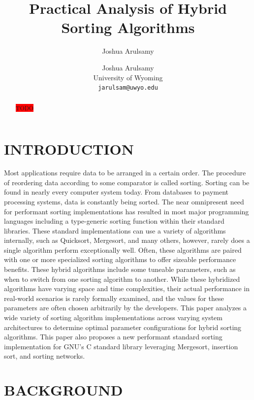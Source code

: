 \documentclass[12pt, conference]{ieeeconf}
\title{\LARGE \bf Practical Analysis of Hybrid Sorting Algorithms}
\author{Joshua Arulsamy}
\author{\parbox{3 in}{
\centering
Joshua Arulsamy\\
University of Wyoming\\
{\tt\small jarulsam@uwyo.edu}}}
\newcommand{\todo}{\colorbox{red}{TODO}}
\begin{document}
\maketitle
\thispagestyle{plain}
\pagestyle{plain}
\nocite{*}

\begin{abstract}

	\todo

\end{abstract}

\section{INTRODUCTION}

Most applications require data to be arranged in a certain order. The procedure
of reordering data according to some comparator is called sorting. Sorting can
be found in nearly every computer system today. From databases to payment
processing systems, data is constantly being sorted. The near omnipresent need
for performant sorting implementations has resulted in most major programming
languages including a type-generic sorting function within their standard
libraries. These standard implementations can use a variety of algorithms
internally, such as Quicksort, Mergesort, and many others, however, rarely does
a single algorithm perform exceptionally well. Often, these algorithms are
paired with one or more specialized sorting algorithms to offer sizeable
performance benefits. These hybrid algorithms include some tuneable parameters,
such as when to switch from one sorting algorithm to another. While these
hybridized algorithms have varying space and time complexities, their actual
performance in real-world scenarios is rarely formally examined, and the values
for these parameters are often chosen arbitrarily by the developers. This paper
analyzes a wide variety of sorting algorithm implementations across varying
system architectures to determine optimal parameter configurations for hybrid
sorting algorithms. This paper also proposes a new performant standard sorting
implementation for GNU's C standard library leveraging Mergesort, insertion
sort, and sorting networks.

\section{BACKGROUND}
\end{document}

